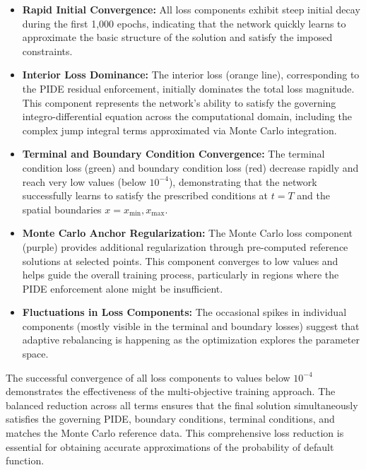 \documentclass[11pt,twoside,openright]{report}
\begin{document}
\begin{itemize}
    \item \textbf{Rapid Initial Convergence:} All loss components exhibit steep initial decay during the first 1,000 epochs, indicating that the network quickly learns to approximate the basic structure of the solution and satisfy the imposed constraints.
    
    \item \textbf{Interior Loss Dominance:} The interior loss (orange line), corresponding to the PIDE residual enforcement, initially dominates the total loss magnitude. This component represents the network's ability to satisfy the governing integro-differential equation across the computational domain, including the complex jump integral terms approximated via Monte Carlo integration.
    
    \item \textbf{Terminal and Boundary Condition Convergence:} The terminal condition loss (green) and boundary condition loss (red) decrease rapidly and reach very low values (below $10^{-4}$), demonstrating that the network successfully learns to satisfy the prescribed conditions at $t=T$ and the spatial boundaries $x=x_{\min}, x_{\max}$.
    
    \item \textbf{Monte Carlo Anchor Regularization:} The Monte Carlo loss component (purple) provides additional regularization through pre-computed reference solutions at selected points. This component converges to low values and helps guide the overall training process, particularly in regions where the PIDE enforcement alone might be insufficient.
    
    \item \textbf{Fluctuations in Loss Components:} The occasional spikes in individual components (mostly visible in the terminal and boundary losses) suggest that adaptive rebalancing is happening as the optimization explores the parameter space.
\end{itemize}

The successful convergence of all loss components to values below $10^{-4}$ demonstrates the effectiveness of the multi-objective training approach. The balanced reduction across all terms ensures that the final solution simultaneously satisfies the governing PIDE, boundary conditions, terminal conditions, and matches the Monte Carlo reference data. This comprehensive loss reduction is essential for obtaining accurate approximations of the probability of default function.
\end{document}
